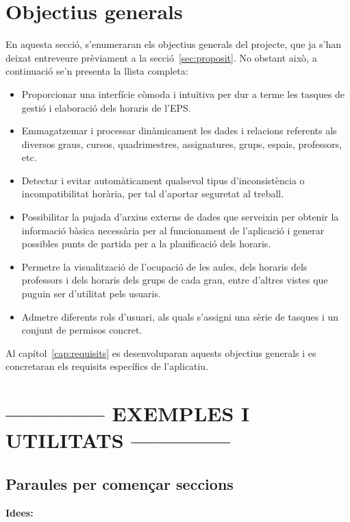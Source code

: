 \documentclass[a4paper,12pt]{ThesisStyle}
\begin{document}
\section{Objectius generals}
\label{sec:objectius_generals}

En aquesta secció, s'enumeraran els objectius generals del projecte, que ja s'han deixat entreveure prèviament a la secció~\ref{sec:proposit}. No obstant això, a continuació se'n presenta la llista completa:
\begin{itemize}
  \item Proporcionar una interfície còmoda i intuïtiva per dur a terme les tasques de gestió i elaboració dels horaris de l'EPS.
  \item Emmagatzemar i processar dinàmicament les dades i relacions referents als diversos graus, cursos, quadrimestres, assignatures, grups, espais, professors, etc.
  \item Detectar i evitar automàticament qualsevol tipus d'inconsistència o incompatibilitat horària, per tal d'aportar seguretat al treball.
  \item Possibilitar la pujada d'arxius externs de dades que serveixin per obtenir la informació bàsica necessària per al funcionament de l'aplicació i generar possibles punts de partida per a la planificació dels horaris.
  \item Permetre la visualització de l'ocupació de les aules, dels horaris dels professors i dels horaris dels grups de cada grau, entre d'altres vistes que puguin ser d'utilitat pels usuaris.
  \item Admetre diferents rols d'usuari, als quals s'assigni una sèrie de tasques i un conjunt de permisos concret.
\end{itemize}

Al capítol~\ref{cap:requisits} es desenvoluparan aquests objectius generals i es concretaran els requisits específics de l'aplicatiu.


\section{-------------- EXEMPLES I UTILITATS --------------}
\subsection{Paraules per començar seccions}
\textbf{Idees:}
\end{document}
